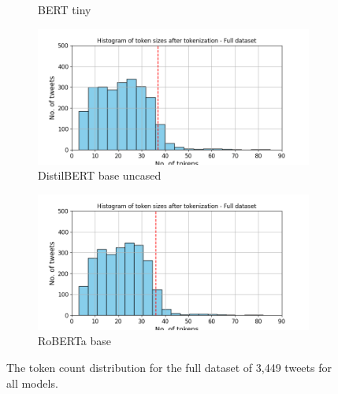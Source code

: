 \begin{figure}[htbp]
\begin{subfigure}[b]{0.48\textwidth}
        \caption{BERT tiny}
        \label{fig: token_pp_hist_tiny}
    \end{subfigure}
    \hfill
    \begin{subfigure}[b]{0.48\textwidth}
        \includegraphics[width=\textwidth]{figures/token_pp_hist_distilbert-base-uncased.png}
        \caption{DistilBERT base uncased}
        \label{fig: token_pp_hist_distilbert}
    \end{subfigure}
    \begin{subfigure}[b]{0.48\textwidth}
        \includegraphics[width=\textwidth]{figures/token_pp_hist_roberta-base.png}
        \caption{RoBERTa base}
        \label{fig: token_pp_hist_roberta}
    \end{subfigure}
    \caption{The token count distribution for the full dataset of 3,449 tweets for all models.}
    \label{fig: apdxa_tokens}
\end{figure}

